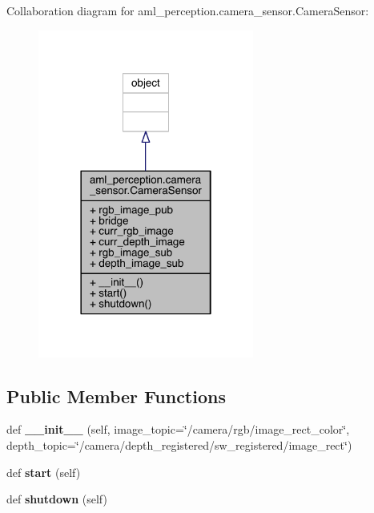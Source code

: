 Collaboration diagram for aml\+\_\+perception.\+camera\+\_\+sensor.\+Camera\+Sensor\+:\nopagebreak
\begin{figure}[H]
\begin{center}
\leavevmode
\includegraphics[width=201pt]{classaml__perception_1_1camera__sensor_1_1_camera_sensor__coll__graph}
\end{center}
\end{figure}
\subsection*{Public Member Functions}
\begin{DoxyCompactItemize}
\item 
\hypertarget{classaml__perception_1_1camera__sensor_1_1_camera_sensor_a315c3e91762a38dbf8ecd07f30e099f1}{}\label{classaml__perception_1_1camera__sensor_1_1_camera_sensor_a315c3e91762a38dbf8ecd07f30e099f1} 
def {\bfseries \+\_\+\+\_\+init\+\_\+\+\_\+} (self, image\+\_\+topic=\char`\"{}/camera/rgb/image\+\_\+rect\+\_\+color\char`\"{}, depth\+\_\+topic=\char`\"{}/camera/depth\+\_\+registered/sw\+\_\+registered/image\+\_\+rect\char`\"{})
\item 
\hypertarget{classaml__perception_1_1camera__sensor_1_1_camera_sensor_a5967f87a0f03eb4dfbabd049921595b4}{}\label{classaml__perception_1_1camera__sensor_1_1_camera_sensor_a5967f87a0f03eb4dfbabd049921595b4} 
def {\bfseries start} (self)
\item 
\hypertarget{classaml__perception_1_1camera__sensor_1_1_camera_sensor_aec9d980f6d93b1df114ceebba4266dfc}{}\label{classaml__perception_1_1camera__sensor_1_1_camera_sensor_aec9d980f6d93b1df114ceebba4266dfc} 
def {\bfseries shutdown} (self)
\end{DoxyCompactItemize}
